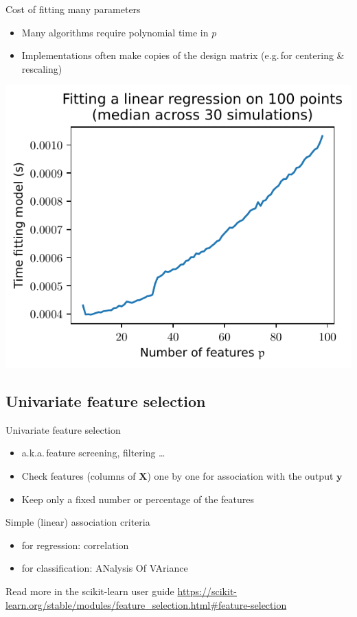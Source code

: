 \documentclass[presentation,mathserif,table]{beamer}
\newcommand{\eg}{e.g.\,}
\newcommand{\aka}{a.k.a.\,}
\newcommand{\X}{{\mathbold X}}
\newcommand{\y}{{\mathbold y}}
\begin{document}
\begin{frame}[label={sec:org0a28cfc}]{Cost of fitting many parameters}
\begin{itemize}
\item Many algorithms require polynomial time in \(p\)
\item Implementations often make copies of the design matrix (\eg for centering \& rescaling)
\end{itemize}
\begin{center}
\includegraphics[height=.7\textheight]{figures/generated/ridge_overfitting/durations.pdf}
\end{center}
\end{frame}
\subsection{Univariate feature selection}
\label{sec:orgde68e16}
\begin{frame}[label={sec:org0975f0c}]{Univariate feature selection}
\begin{itemize}
\item \aka feature screening, filtering \ldots{}
\item Check features (columns of \(\X\)) one by one for association with the output \(\y\)
\item Keep only a fixed number or percentage of the features
\end{itemize}
\begin{block}{Simple (linear) association criteria}
\begin{itemize}
\item for regression: correlation
\item for classification: ANalysis Of VAriance
\end{itemize}
\end{block}
\begin{block}{Read more in the scikit-learn user guide}
\url{https://scikit-learn.org/stable/modules/feature\_selection.html\#feature-selection}
\end{block}
\end{frame}
\end{document}
